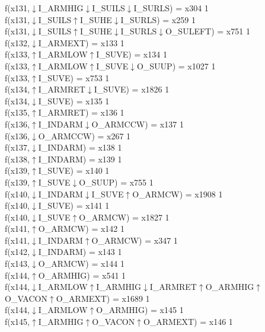 f(x131,$\downarrow$I\_ARMHIG$\downarrow$I\_SUILS$\downarrow$I\_SURLS) = x304 {1} \\
f(x131,$\downarrow$I\_SUILS$\uparrow$I\_SUHE$\downarrow$I\_SURLS) = x259 {1} \\
f(x131,$\downarrow$I\_SUILS$\uparrow$I\_SUHE$\downarrow$I\_SURLS$\downarrow$O\_SULEFT) = x751 {1} \\
f(x132,$\downarrow$I\_ARMEXT) = x133 {1} \\
f(x133,$\uparrow$I\_ARMLOW$\uparrow$I\_SUVE) = x134 {1} \\
f(x133,$\uparrow$I\_ARMLOW$\uparrow$I\_SUVE$\downarrow$O\_SUUP) = x1027 {1} \\
f(x133,$\uparrow$I\_SUVE) = x753 {1} \\
f(x134,$\uparrow$I\_ARMRET$\downarrow$I\_SUVE) = x1826 {1} \\
f(x134,$\downarrow$I\_SUVE) = x135 {1} \\
f(x135,$\uparrow$I\_ARMRET) = x136 {1} \\
f(x136,$\uparrow$I\_INDARM$\downarrow$O\_ARMCCW) = x137 {1} \\
f(x136,$\downarrow$O\_ARMCCW) = x267 {1} \\
f(x137,$\downarrow$I\_INDARM) = x138 {1} \\
f(x138,$\uparrow$I\_INDARM) = x139 {1} \\
f(x139,$\uparrow$I\_SUVE) = x140 {1} \\
f(x139,$\uparrow$I\_SUVE$\downarrow$O\_SUUP) = x755 {1} \\
f(x140,$\downarrow$I\_INDARM$\downarrow$I\_SUVE$\uparrow$O\_ARMCW) = x1908 {1} \\
f(x140,$\downarrow$I\_SUVE) = x141 {1} \\
f(x140,$\downarrow$I\_SUVE$\uparrow$O\_ARMCW) = x1827 {1} \\
f(x141,$\uparrow$O\_ARMCW) = x142 {1} \\
f(x141,$\downarrow$I\_INDARM$\uparrow$O\_ARMCW) = x347 {1} \\
f(x142,$\downarrow$I\_INDARM) = x143 {1} \\
f(x143,$\downarrow$O\_ARMCW) = x144 {1} \\
f(x144,$\uparrow$O\_ARMHIG) = x541 {1} \\
f(x144,$\downarrow$I\_ARMLOW$\uparrow$I\_ARMHIG$\downarrow$I\_ARMRET$\uparrow$O\_ARMHIG$\uparrow$O\_VACON$\uparrow$O\_ARMEXT) = x1689 {1} \\
f(x144,$\downarrow$I\_ARMLOW$\uparrow$O\_ARMHIG) = x145 {1} \\
f(x145,$\uparrow$I\_ARMHIG$\uparrow$O\_VACON$\uparrow$O\_ARMEXT) = x146 {1} \\

